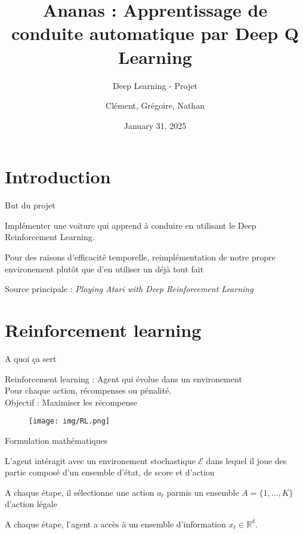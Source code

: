 \documentclass{beamer}
\begin{document}
	
	\title{Ananas : Apprentissage de conduite automatique par Deep Q Learning}
	\subtitle{Deep Learning - Projet}
	\author{Clément, Grégoire, Nathan}
	\date{January 31, 2025}
	
	\maketitle
	
	\section{Introduction}
	
	\begin{frame}{But du projet}
		
		Implémenter une voiture qui apprend à conduire en utilisant le Deep Reinforcement Learning.
		
		Pour des raisons d'efficacité temporelle, reimplémentation de notre propre environement plutôt que d'en utiliser un déjà tout fait
		
		Source principale : \textit{Playing Atari with Deep Reinforcement Learning}
		
	\end{frame}
	
	\section{Reinforcement learning}
	
	\begin{frame}{A quoi ça sert}
		
		Reinforcement learning : Agent qui évolue dans un environement \\
		Pour chaque action, récompenses ou pénalité. \\
		Objectif : Maximiser les récompense
		
		\begin{figure}
			\centering
			\texttt{[image: img/RL.png]}
		\end{figure}
	
	\end{frame}
	
	\begin{frame}{Formulation mathématiques}
		
		L'agent intéragit avec un environement stochastique $\mathcal{E}$ dans lequel il joue des partie composé d'un ensemble d'état, de score et d'action
		
		A chaque étape, il sélectionne une action $a_t$ parmis un ensemble $A = \{1, ..., K\}$ d'action légale
		
		A chaque étape, l'agent a accès à un ensemble d'information $x_t \in \mathbb{R}^d$.
	
	\end{frame}
	
\end{document}
